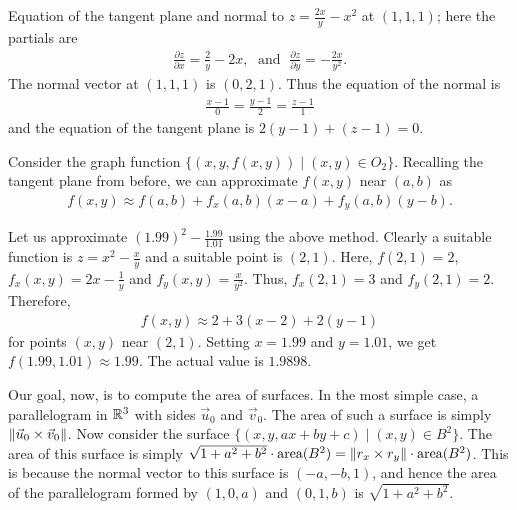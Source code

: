 \begin{example}
    Equation of the tangent plane and normal to $z = \frac{2x}{y} - x^{2}$ at $(1,1,1)$; here the partials are
    \begin{align}
        \frac{\partial z}{\partial x} = \frac{2}{y} - 2x,\; \text{ and }\; \frac{\partial z}{\partial y} = -\frac{2x}{y^{2}}.
    \end{align}
    The normal vector at $(1,1,1)$ is $(0,2,1)$. Thus the equation of the normal is
    \begin{align}
        \frac{x-1}{0} = \frac{y-1}{2} = \frac{z-1}{1}
    \end{align}
    and the equation of the tangent plane is $2(y-1) + (z-1) = 0$.
\end{example}

\begin{remark}
    Consider the graph function $\{(x,y,f(x,y)) \mid (x,y) \in O_{2}\}$. Recalling the tangent plane from before, we can approximate $f(x,y)$ near $(a,b)$ as
    \begin{align}
        f(x,y) \approx f(a,b) + f_{x}(a,b)(x-a) + f_{y}(a,b)(y-b).
    \end{align}
\end{remark}

\begin{example}
    Let us approximate $(1.99)^{2} - \frac{1.99}{1.01}$ using the above method. Clearly a suitable function is $z = x^{2}-\frac{x}{y}$ and a suitable point is $(2,1)$. Here, $f(2,1) = 2$, $f_{x}(x,y) = 2x - \frac{1}{y}$ and $f_{y}(x,y) = \frac{x}{y^{2}}$. Thus, $f_{x}(2,1) = 3$ and $f_{y}(2,1) = 2$. Therefore,
    \begin{align}
        f(x,y) \approx 2 + 3(x-2) + 2(y-1)
    \end{align}
    for points $(x,y)$ near $(2,1)$. Setting $x = 1.99$ and $y = 1.01$, we get $f(1.99,1.01) \approx 1.99$. The actual value is $1.9898$.
\end{example}

Our goal, now, is to compute the area of surfaces. In the most simple case, a parallelogram in $\mathbb{R}^{3}$ with sides $\vec{u}_{0}$ and $\vec{v}_{0}$. The area of such a surface is simply $\left\lVert\vec{u}_{0} \times \vec{v}_{0}\right\rVert$. Now consider the surface $\{(x,y,ax+by+c) \mid (x,y) \in B^{2}\}$. The area of this surface is simply $\sqrt{1+a^{2}+b^{2}} \cdot \text{area}(B^{2}) = \left\lVert r_{x} \times r_{y}\right\rVert \cdot \text{area}(B^{2})$. This is because the normal vector to this surface is $(-a,-b,1)$, and hence the area of the parallelogram formed by $(1,0,a)$ and $(0,1,b)$ is $\sqrt{1+a^{2}+b^{2}}$.

